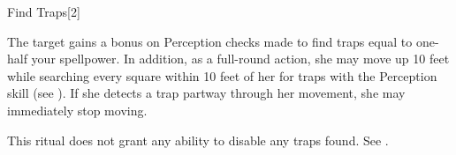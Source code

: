 \begin{spellsection}{Find Traps}[2]
    \begin{spellheader}
    \end{spellheader}
    \begin{spellcontent}
        \begin{spelltargetinginfo}
        \end{spelltargetinginfo}
        \begin{spelleffects}

            \spelleffect The target gains a bonus on Perception checks made to find traps equal to one-half your spellpower. In addition, as a full-round action, she may move up 10 feet while searching every square within 10 feet of her for traps with the Perception skill (see ). If she detects a trap partway through her movement, she may immediately stop moving.
            \spelldur \durmed
        \end{spelleffects}
    \end{spellcontent}
    \begin{spellfooter}
        \spellnotes This ritual does not grant any ability to disable any traps found. See .
    \end{spellfooter}
\end{spellsection}

